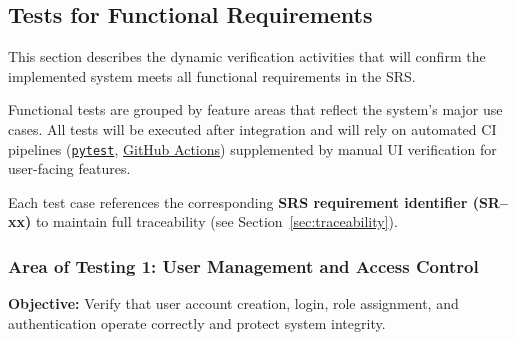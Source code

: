 \documentclass[12pt, titlepage]{article}
\begin{document}
\subsection{Tests for Functional Requirements}
\label{subsec:functional-tests}

This section describes the dynamic verification activities that will confirm the implemented system meets all functional requirements in the SRS.

Functional tests are grouped by feature areas that reflect the system’s major use cases.
All tests will be executed after integration and will rely on automated CI pipelines
(\texttt{\href{https://requests-mock.readthedocs.io/en/latest/overview.html}{pytest}}, \href{https://github.com/thaafei/DomainX/actions}{GitHub Actions}) supplemented by manual UI verification for user-facing features.

Each test case references the corresponding \textbf{SRS requirement identifier (SR--xx)} to maintain full traceability (see Section~\ref{sec:traceability}).

\subsubsection{Area of Testing 1: User Management and Access Control}
\textbf{Objective:} Verify that user account creation, login, role assignment, and authentication operate correctly and protect system integrity.
\end{document}
